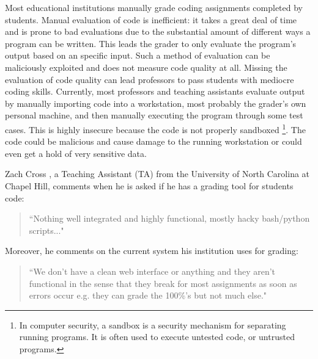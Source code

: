 

Most educational institutions manually grade coding assignments completed by
students. Manual evaluation of code is inefficient: it takes a great deal of
time and is prone to bad evaluations due to the substantial amount of
different ways a program can be written. This leads the grader to only
evaluate the program's output based on an specific input. Such a method of
evaluation can be maliciously exploited and does not measure code quality at
all. Missing the evaluation of code quality can lead professors to pass
students with mediocre coding skills. Currently, most professors and teaching
assistants evaluate output by manually importing code into a workstation, most
probably the grader's own personal machine, and then manually executing the
program through some test cases. This is highly insecure because the code is
not properly sandboxed \footnote{In computer security, a sandbox is a security
mechanism for separating running programs. It is often used to execute
untested code, or untrusted programs.}. The code could be malicious and cause
damage to the running workstation or could even get a hold of very sensitive
data.


Zach Cross \cite{Zach}, a Teaching Assistant (TA) from the University of North
Carolina at Chapel Hill, comments when he is asked if he has a grading tool
for students code: \begin{quote} ``Nothing well integrated and highly
functional, mostly hacky bash/python scripts..." \end{quote} Moreover, he
comments on the current system his institution uses for grading: \begin{quote}
``We don't have a clean web interface or anything and they aren't functional
in the sense that they break for most assignments as soon as errors occur e.g.
they can grade the 100\%'s but not much else." \end{quote}

